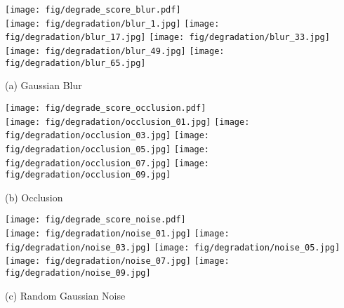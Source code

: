 \documentclass[10pt,twocolumn,letterpaper]{article}
\begin{document}
\begin{figure*}[t]
    \centering
    \captionsetup{font=footnotesize}
    \begin{minipage}{0.33\linewidth}
    \texttt{[image: fig/degrade\_score\_blur.pdf]}\\ \centering
    \texttt{[image: fig/degradation/blur\_1.jpg]}\;
    \texttt{[image: fig/degradation/blur\_17.jpg]}\;
    \texttt{[image: fig/degradation/blur\_33.jpg]}\;
    \texttt{[image: fig/degradation/blur\_49.jpg]}\;
    \texttt{[image: fig/degradation/blur\_65.jpg]}\vspace{-0.5em}
    \begin{center} \footnotesize(a) Gaussian Blur \end{center}\vspace{-1.2em}
    \end{minipage}\hfill
    \begin{minipage}{0.33\linewidth}
    \texttt{[image: fig/degrade\_score\_occlusion.pdf]}\\
    \centering
    \texttt{[image: fig/degradation/occlusion\_01.jpg]}\;
    \texttt{[image: fig/degradation/occlusion\_03.jpg]}\;
    \texttt{[image: fig/degradation/occlusion\_05.jpg]}\;
    \texttt{[image: fig/degradation/occlusion\_07.jpg]}\;
    \texttt{[image: fig/degradation/occlusion\_09.jpg]}\vspace{-0.5em}
    \begin{center} \footnotesize(b) Occlusion \end{center}\vspace{-1.2em}
    \end{minipage}\hfill
    \begin{minipage}{0.33\linewidth}
    \texttt{[image: fig/degrade\_score\_noise.pdf]}\\
    \centering
    \texttt{[image: fig/degradation/noise\_01.jpg]}\;
    \texttt{[image: fig/degradation/noise\_03.jpg]}\;
    \texttt{[image: fig/degradation/noise\_05.jpg]}\;
    \texttt{[image: fig/degradation/noise\_07.jpg]}\;
    \texttt{[image: fig/degradation/noise\_09.jpg]}\vspace{-0.5em}
    \begin{center} \footnotesize(c) Random Gaussian Noise \end{center}\vspace{-1.2em}

\end{minipage}
\end{figure*}
\end{document}
